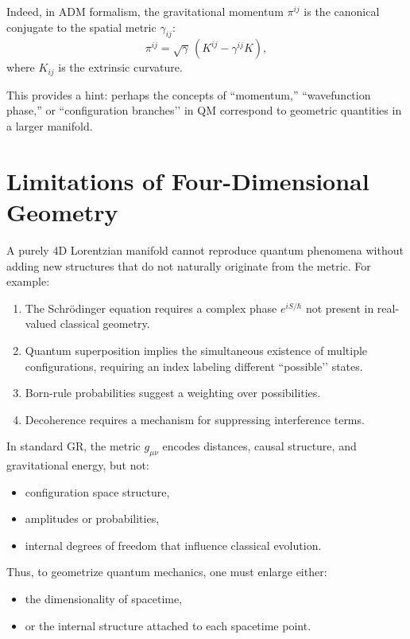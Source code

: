 \documentclass[12pt]{article}
\begin{document}
Indeed, in ADM formalism, the gravitational momentum \(\pi^{ij}\) is the 
canonical conjugate to the spatial metric \(\gamma_{ij}\):
\begin{equation}
\pi^{ij} = \sqrt{\gamma}\,(K^{ij} - \gamma^{ij} K),
\end{equation}
where \(K_{ij}\) is the extrinsic curvature.

This provides a hint: perhaps the concepts of “momentum,” “wavefunction phase,” 
or “configuration branches’’ in QM correspond to geometric quantities in a 
larger manifold.


\newpage
\section{Limitations of Four-Dimensional Geometry}

A purely 4D Lorentzian manifold cannot reproduce quantum phenomena without 
adding new structures that do not naturally originate from the metric. For 
example:
\begin{enumerate}
\item The Schrödinger equation requires a complex phase \(e^{iS/\hbar}\) not 
present in real-valued classical geometry.
\item Quantum superposition implies the simultaneous existence of multiple 
configurations, requiring an index labeling different “possible’’ states.
\item Born-rule probabilities suggest a weighting over possibilities.
\item Decoherence requires a mechanism for suppressing interference terms.
\end{enumerate}

In standard GR, the metric \(g_{\mu\nu}\) encodes distances, causal structure, 
and gravitational energy, but not:
\begin{itemize}
\item configuration space structure,
\item amplitudes or probabilities,
\item internal degrees of freedom that influence classical evolution.
\end{itemize}

Thus, to geometrize quantum mechanics, one must enlarge either:
\begin{itemize}
\item the dimensionality of spacetime,
\item or the internal structure attached to each spacetime point.
\end{itemize}
\end{document}
